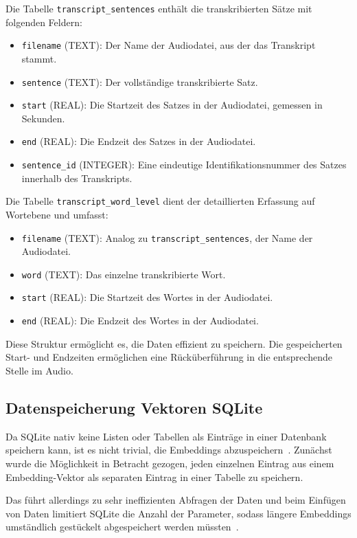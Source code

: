 Die Tabelle \texttt{transcript\_sentences} enthält die transkribierten Sätze mit folgenden Feldern:
\begin{itemize}
  \item \texttt{filename} (TEXT): Der Name der Audiodatei, aus der das Transkript stammt.
  \item \texttt{sentence} (TEXT): Der vollständige transkribierte Satz.
  \item \texttt{start} (REAL): Die Startzeit des Satzes in der Audiodatei, gemessen in Sekunden.
  \item \texttt{end} (REAL): Die Endzeit des Satzes in der Audiodatei.
  \item \texttt{sentence\_id} (INTEGER): Eine eindeutige Identifikationsnummer des Satzes innerhalb des Transkripts.
\end{itemize}

Die Tabelle \texttt{transcript\_word\_level} dient der detaillierten Erfassung auf Wortebene und umfasst:
\begin{itemize}
  \item \texttt{filename} (TEXT): Analog zu \texttt{transcript\_sentences}, der Name der Audiodatei.
  \item \texttt{word} (TEXT): Das einzelne transkribierte Wort.
  \item \texttt{start} (REAL): Die Startzeit des Wortes in der Audiodatei.
  \item \texttt{end} (REAL): Die Endzeit des Wortes in der Audiodatei.
\end{itemize}

Diese Struktur ermöglicht es, die Daten effizient zu speichern. 
Die gespeicherten Start- und Endzeiten ermöglichen eine Rücküberführung in die entsprechende Stelle im Audio.

\subsection{Datenspeicherung Vektoren SQLite}

Da SQLite nativ keine Listen oder Tabellen als Einträge in einer Datenbank speichern kann, ist es nicht trivial, die Embeddings abzuspeichern~\cite{zotero-555}.
Zunächst wurde die Möglichkeit in Betracht gezogen, jeden einzelnen Eintrag aus einem Embedding-Vektor als separaten Eintrag in einer Tabelle zu speichern.

Das führt allerdings zu sehr ineffizienten Abfragen der Daten und beim Einfügen von Daten limitiert SQLite die Anzahl der Parameter, sodass längere Embeddings umständlich gestückelt abgespeichert werden müssten~\cite{zotero-557}.

